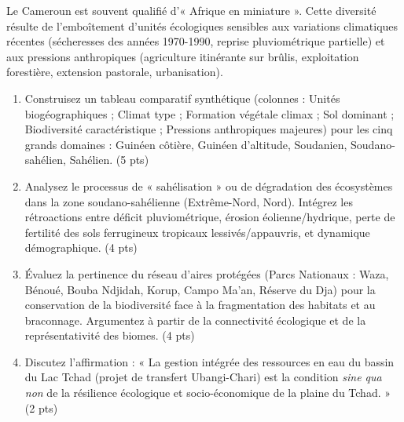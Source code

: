 \documentclass[11pt]{article}
\begin{document}
\begin{exercice}
    Le Cameroun est souvent qualifié d'« Afrique en miniature ». Cette diversité résulte de l'emboîtement d'unités écologiques sensibles aux variations climatiques récentes (sécheresses des années 1970-1990, reprise pluviométrique partielle) et aux pressions anthropiques (agriculture itinérante sur brûlis, exploitation forestière, extension pastorale, urbanisation).
    \begin{enumerate}
        \item Construisez un tableau comparatif synthétique (colonnes : Unités biogéographiques ; Climat type ; Formation végétale climax ; Sol dominant ; Biodiversité caractéristique ; Pressions anthropiques majeures) pour les cinq grands domaines : Guinéen côtière, Guinéen d'altitude, Soudanien, Soudano-sahélien, Sahélien. (5 pts)
        \item Analysez le processus de « sahélisation » ou de dégradation des écosystèmes dans la zone soudano-sahélienne (Extrême-Nord, Nord). Intégrez les rétroactions entre déficit pluviométrique, érosion éolienne/hydrique, perte de fertilité des sols ferrugineux tropicaux lessivés/appauvris, et dynamique démographique. (4 pts)
        \item Évaluez la pertinence du réseau d'aires protégées (Parcs Nationaux : Waza, Bénoué, Bouba Ndjidah, Korup, Campo Ma'an, Réserve du Dja) pour la conservation de la biodiversité face à la fragmentation des habitats et au braconnage. Argumentez à partir de la connectivité écologique et de la représentativité des biomes. (4 pts)
        \item Discutez l'affirmation : « La gestion intégrée des ressources en eau du bassin du Lac Tchad (projet de transfert Ubangi-Chari) est la condition \textit{sine qua non} de la résilience écologique et socio-économique de la plaine du Tchad. » (2 pts)
    \end{enumerate}
\end{exercice}
\end{document}
